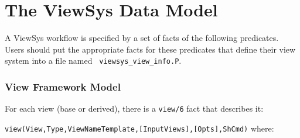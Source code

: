 \section{The ViewSys Data Model}

A ViewSys workflow is specified by a set of facts of the following
predicates.  Users should put the appropriate facts for these
predicates that define their view system into a file named {\tt
  viewsys\_view\_info.P}.

\subsubsection{View Framework Model}

For each view (base or derived), there is a {\tt view/6} fact that
describes it:

{\tt view(View,Type,ViewNameTemplate,[InputViews],[Opts],ShCmd)}
\noindent
where:

